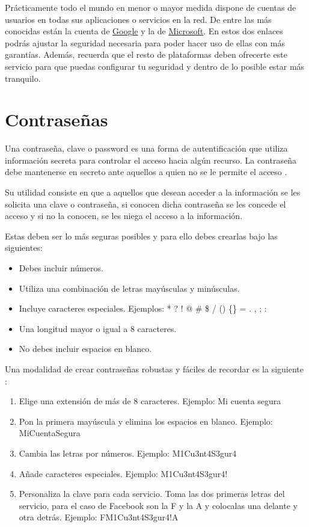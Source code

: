 \documentclass[
  a4paper,
  openany]{book}
\begin{document}
Prácticamente todo el mundo en menor o mayor medida dispone de cuentas de usuarios en todas sus aplicaciones o servicios en la red. De entre las más conocidas están la cuenta de \href{https://myaccount.google.com/security}{Google} y la de \href{https://account.microsoft.com/security}{Microsoft}. En estos dos enlaces podrás ajustar la seguridad necesaria para poder hacer uso de ellas con más garantías. Además, recuerda que el resto de plataformas deben ofrecerte este servicio para que puedas configurar tu seguridad y dentro de lo posible estar más tranquilo.

\hypertarget{contraseuxf1as}{%
\section{Contraseñas}\label{contraseuxf1as}}

Una contraseña, clave o password es una forma de autentificación que utiliza información secreta para controlar el acceso hacia algún recurso. La contraseña debe mantenerse en secreto ante aquellos a quien no se le permite el acceso \citep{WIKI-password}.

Su utilidad consiste en que a aquellos que desean acceder a la información se les solicita una clave o contraseña, si conocen dicha contraseña se les concede el acceso y si no la conocen, se les niega el acceso a la información.

Estas deben ser lo más seguras posibles y para ello debes crearlas bajo las siguientes:

\begin{itemize}
\item
  Debes incluir números.
\item
  Utiliza una combinación de letras mayúsculas y minúsculas.
\item
  Incluye caracteres especiales. Ejemplos: * ? ! @ \# \$ / () \{\} = . , ; :
\item
  Una longitud mayor o igual a 8 caracteres.
\item
  No debes incluir espacios en blanco.
\end{itemize}

Una modalidad de crear contraseñas robustas y fáciles de recordar es la siguiente \citep{OSI-contraseñas}:

\begin{enumerate}
\def\labelenumi{\arabic{enumi}.}
\item
  Elige una extensión de más de 8 caracteres. Ejemplo: Mi cuenta segura
\item
  Pon la primera mayúscula y elimina los espacios en blanco. Ejemplo: MiCuentaSegura
\item
  Cambia las letras por números. Ejemplo: M1Cu3nt4S3gur4
\item
  Añade caracteres especiales. Ejemplo: M1Cu3nt4S3gur4!
\item
  Personaliza la clave para cada servicio. Toma las dos primeras letras del servicio, para el caso de Facebook son la F y la A y colocalas una delante y otra detrás. Ejemplo: FM1Cu3nt4S3gur4!A
\end{enumerate}
\end{document}
